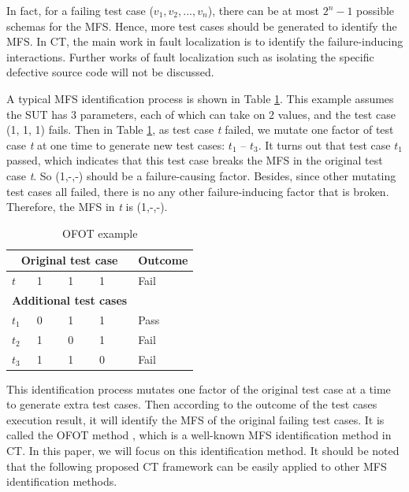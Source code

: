 \documentclass[journal,12pt,onecolumn,draftclsnofoot,]{IEEEtran}
\begin{document}
In fact, for a failing test case ($v_{1},v_{2},...,v_{n}$), there can be at most $2^{n} - 1$ possible schemas for the MFS. Hence, more test cases should be generated to identify the MFS. In CT, the main work in fault localization is to identify the failure-inducing interactions. Further works of fault localization such as isolating the specific defective source code will not be discussed.

A typical MFS identification process is shown in Table \ref{ofot-identify}. This example assumes the SUT has 3 parameters, each of which can take on 2 values, and the test case (1, 1, 1) fails. Then in Table \ref{ofot-identify}, as test case \emph{t} failed, we mutate one factor of test case \emph{t} at one time to generate new test cases: $t_{1}$ -- $t_{3}$. It turns out that test case $t_{1}$ passed, which indicates that this test case breaks the MFS in the original test case \emph{t}. So (1,-,-) should be a failure-causing factor. Besides, since other mutating test cases all failed, there is no any other failure-inducing factor that is broken. Therefore, the MFS in \emph{t} is (1,-,-).

\begin{table}[!t]
\caption{OFOT example}
\label{ofot-identify}
\centering
\begin{tabular}{llllll}
 \hline
\multicolumn{5}{c}{\bfseries Original test case} & \bfseries Outcome \\  \hline
 $t$ & \multicolumn{4}{l}{1 \ \ \ \ 1 \ \ \ \  1 } & Fail \\
 \hline
\multicolumn{5}{c}{\bfseries Additional  test cases} &  \\  \hline
$t_{1}$ &\multicolumn{4}{l}{0  \ \ \ \  1 \ \ \ \  1 }& Pass \\
$t_{2}$ &\multicolumn{4}{l}{1  \ \ \ \  0 \ \ \ \  1 } & Fail \\
$t_{3}$ &\multicolumn{4}{l}{1  \ \ \ \  1 \ \ \ \  0 } & Fail \\
 \hline
\end{tabular}
\end{table}

This identification process mutates one factor of the original test case at a time to generate extra test cases. Then according to the outcome of the test cases execution result, it will identify the MFS of the original failing test cases. It is called the OFOT method \cite{nie2011minimal}, which is a well-known MFS identification method in CT. In this paper, we will focus on this identification method. It should be noted that the following proposed CT framework can be easily applied to other MFS identification methods.
\end{document}

